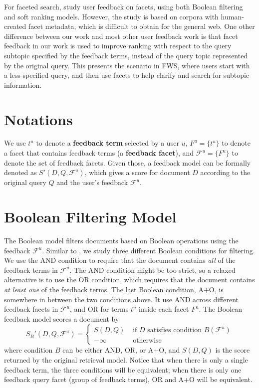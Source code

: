 For faceted search, \citet{zhang2010interactive} study user feedback on facets, using both Boolean filtering and soft ranking models. However, the study is based on corpora with human-created facet metadata, which is difficult to obtain for the 
general web.  One other difference between our work and most other user feedback work is that facet feedback in our work is used to improve ranking with respect to the query subtopic specified by the feedback terms, instead of the query topic represented by the original query. This presents the scenario in FWS, where users start with a less-specified query, and then use facets to help clarify and search for subtopic information.

\section{Notations} \label{sec:fdbk-notations}
We use $t^u$ to denote a \textbf{feedback term} selected by a user $u$, $F^u=\{t^u\}$ to denote a facet that contains feedback terms (a \textbf{feedback facet}), and $\mathcal{F}^u=\{F^u\}$ to denote the set of feedback facets. Given those, a feedback model can be formally denoted as $S'(D,Q,\mathcal{F}^u)$, which gives a score for document $D$ according to the original query $Q$ and the user's feedback $\mathcal{F}^u$. 

\section{Boolean Filtering Model} \label{sec:fdbk-filter}
The Boolean model filters documents based on Boolean operations using the feedback $\mathcal{F}^u$. Similar to \citet{zhang2010interactive}, we study three different Boolean conditions for filtering. We use the AND condition to require that the document contains \emph{all} of the feedback terms in $\mathcal{F}^u$. The AND condition might be too strict, so a relaxed alternative is to use the OR condition, which requires that the document contains \emph{at least one} of the feedback terms. The last Boolean condition, A+O, is somewhere in between the two conditions above. It use AND across different feedback facets in $\mathcal{F}^u$, and OR for terms $t^u$ inside each facet $F^u$. The Boolean feedback model scores a document by
\begin{equation}
S_{B}'(D,Q,\mathcal{F}^u) = \left\{ \begin{array}{ll}
S(D,Q) &\mbox{ if $D$ satisfies condition $B(\mathcal{F}^u)$} \\
-\infty &\mbox{ otherwise}
\end{array} \right.
\end{equation}
where condition $B$ can be either AND, OR, or A+O, and $S(D,Q)$ is the score returned by the original retrieval model. Notice that when there is only a single feedback term, the three conditions will be equivalent; when there is only one feedback query facet (group of feedback terms), OR and A+O will be equivalent.

